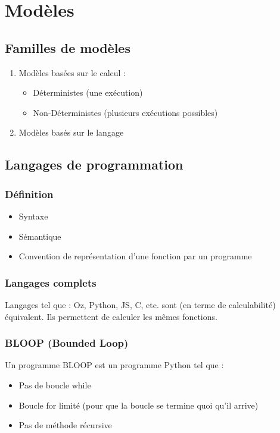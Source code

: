 \chapter{Modèles}

\section{Familles de modèles}

\begin{enumerate}
\item Modèles basées sur le calcul :
	\begin{itemize}
	\item Déterministes (une exécution)
	\item Non-Déterministes (plusieurs exécutions possibles)
	\end{itemize}
\item Modèles basés sur le langage
\end{enumerate}

\section{Langages de programmation}

\subsection{Définition}

\begin{itemize}
\item Syntaxe
\item Sémantique
\item Convention de représentation d'une fonction par un programme
\end{itemize}

\subsection{Langages complets}

Langages tel que : Oz, Python, JS, C, etc. sont (en terme de calculabilité) équivalent. Ils permettent de calculer les mêmes fonctions.

\subsection{BLOOP (Bounded Loop)}

Un programme BLOOP est un programme Python tel que :
\begin{itemize}
\item Pas de boucle while
\item Boucle for limité (pour que la boucle se termine quoi qu'il arrive)
\item Pas de méthode récursive
\end{itemize}

